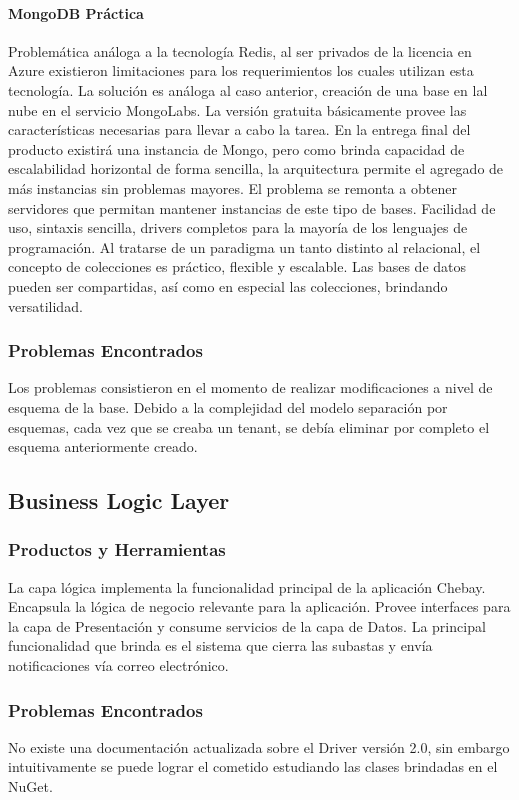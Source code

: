\documentclass[journal]{IEEEtran}
\begin{document}
\paragraph{MongoDB Práctica}
Problemática análoga a la tecnología Redis, al ser privados de la licencia en Azure existieron limitaciones para los requerimientos los cuales utilizan esta tecnología. La solución es análoga al caso anterior, creación de una base en lal nube en el servicio MongoLabs. La versión gratuita básicamente provee las características necesarias para llevar a cabo la tarea. En la entrega final del producto existirá una instancia de Mongo, pero como brinda capacidad de escalabilidad horizontal de forma sencilla, la arquitectura permite el agregado de más instancias sin problemas mayores. El problema se remonta a obtener servidores que permitan mantener instancias de este tipo de bases.
Facilidad de uso, sintaxis sencilla, drivers completos para la mayoría de los lenguajes de programación. Al tratarse de un paradigma un tanto distinto al relacional, el concepto de colecciones es práctico, flexible y escalable. Las bases de datos pueden ser compartidas, así como en especial las colecciones, brindando versatilidad.

\subsubsection{Problemas Encontrados}
Los problemas consistieron en el momento de realizar modificaciones a nivel de esquema de la base. Debido a la complejidad del modelo separación por esquemas, cada vez que se creaba un tenant, se debía eliminar por completo el esquema anteriormente creado.


\subsection{Business Logic Layer}
\subsubsection{Productos y Herramientas}
La capa lógica implementa la funcionalidad principal de la aplicación Chebay. Encapsula la lógica de negocio relevante para la aplicación. Provee interfaces para la capa de Presentación y consume servicios de la capa de Datos. La principal funcionalidad que brinda es el sistema que cierra las subastas y envía notificaciones vía correo electrónico.

\subsubsection{Problemas Encontrados}
No existe una documentación actualizada sobre el Driver versión 2.0, sin embargo intuitivamente se puede lograr el cometido estudiando las clases brindadas en el NuGet.
\end{document}
